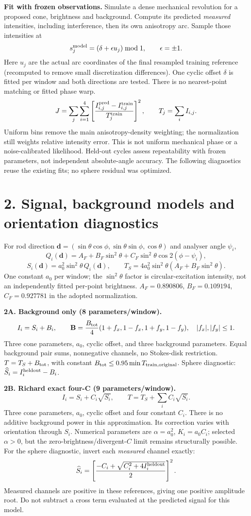 \documentclass[10pt,a4paper]{article}
\begin{document}
\textbf{Fit with frozen observations.} Simulate a dense mechanical revolution for a proposed cone, brightness and background. Compute its predicted \emph{measured} intensities, including interference, then its own anisotropy arc. Sample those intensities at
\[
s_j^{\rm model}=(\delta+\epsilon u_j)\bmod1,\qquad \epsilon=\pm1.
\]
Here $u_j$ are the actual arc coordinates of the final resampled training reference (recomputed to remove small discretization differences). One cyclic offset $\delta$ is fitted per window and both directions are tested. There is no nearest-point matching or fitted phase warp.
\[
J=\sum_j\sum_{i=1}^4\left[\frac{I_{i,j}^{\rm pred}-I_{i,j}^{\rm train}}{T_j^{\rm train}}\right]^2,
\qquad T_j=\sum_i I_{i,j}.
\]
Uniform bins remove the main anisotropy-density weighting; the normalization still weights relative intensity error. This is not uniform mechanical phase or a noise-calibrated likelihood. Held-out cycles assess repeatability with frozen parameters, not independent absolute-angle accuracy. The following diagnostics reuse the existing fits; no sphere residual was optimized.
\newpage
\section*{2. Signal, background models and orientation diagnostics}
For rod direction $\mathbf d=(\sin\theta\cos\phi,\sin\theta\sin\phi,\cos\theta)$ and analyser angle $\psi_i$,
\[
Q_i(\mathbf d)=A_F+B_F\sin^2\theta+C_F\sin^2\theta\cos2(\phi-\psi_i),
\]
\[
S_i(\mathbf d)=a_0^2\sin^2\theta\,Q_i(\mathbf d),\qquad
T_S=4a_0^2\sin^2\theta(A_F+B_F\sin^2\theta).
\]
One constant $a_0$ per window; the $\sin^2\theta$ factor is circular-excitation intensity, not an independently fitted per-point brightness. $A_F=0.890806$, $B_F=0.109194$, $C_F=0.927781$ in the adopted normalization.

\textbf{2A. Background only (8 parameters/window).}
\[
I_i=S_i+B_i,\qquad
\mathbf B=\frac{B_{\rm tot}}4(1+f_x,1-f_x,1+f_y,1-f_y),\quad |f_x|,|f_y|\leq1.
\]
Three cone parameters, $a_0$, cyclic offset, and three background parameters. Equal background pair sums, nonnegative channels, no Stokes-disk restriction. $T=T_S+B_{\rm tot}$, with constant $B_{\rm tot}\leq0.95\min T_{\rm train,original}$. Sphere diagnostic: $\widehat S_i=I_i^{\rm heldout}-B_i$.

\textbf{2B. Richard exact four-C (9 parameters/window).}
\[
I_i=S_i+C_i\sqrt{S_i},\qquad T=T_S+\sum_i C_i\sqrt{S_i}.
\]
Three cone parameters, $a_0$, cyclic offset and four constant $C_i$. There is no additive background power in this approximation. Its correction varies with orientation through $S_i$. Numerical parameters are $\alpha=a_0^2$, $K_i=a_0C_i$; selected $\alpha>0$, but the zero-brightness/divergent-$C$ limit remains structurally possible. For the sphere diagnostic, invert each \emph{measured} channel exactly:
\[
\widehat S_i=\left[\frac{-C_i+\sqrt{C_i^2+4I_i^{\rm heldout}}}{2}\right]^2.
\]
Measured channels are positive in these references, giving one positive amplitude root. Do not subtract a cross term evaluated at the predicted signal for this model.
\end{document}
